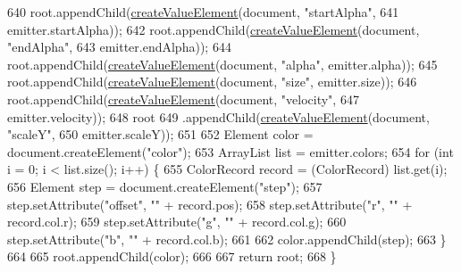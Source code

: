 \begin{DoxyCode}
640         root.appendChild(\mbox{\hyperlink{classorg_1_1newdawn_1_1slick_1_1particles_1_1_particle_i_o_ad9f392331cc84467398b6ac9c41a1d7b}{createValueElement}}(document, \textcolor{stringliteral}{"startAlpha"},
641                 emitter.startAlpha));
642         root.appendChild(\mbox{\hyperlink{classorg_1_1newdawn_1_1slick_1_1particles_1_1_particle_i_o_ad9f392331cc84467398b6ac9c41a1d7b}{createValueElement}}(document, \textcolor{stringliteral}{"endAlpha"},
643                 emitter.endAlpha));
644         root.appendChild(\mbox{\hyperlink{classorg_1_1newdawn_1_1slick_1_1particles_1_1_particle_i_o_ad9f392331cc84467398b6ac9c41a1d7b}{createValueElement}}(document, \textcolor{stringliteral}{"alpha"}, emitter.alpha));
645         root.appendChild(\mbox{\hyperlink{classorg_1_1newdawn_1_1slick_1_1particles_1_1_particle_i_o_ad9f392331cc84467398b6ac9c41a1d7b}{createValueElement}}(document, \textcolor{stringliteral}{"size"}, emitter.size));
646         root.appendChild(\mbox{\hyperlink{classorg_1_1newdawn_1_1slick_1_1particles_1_1_particle_i_o_ad9f392331cc84467398b6ac9c41a1d7b}{createValueElement}}(document, \textcolor{stringliteral}{"velocity"},
647                 emitter.velocity));
648         root
649                 .appendChild(\mbox{\hyperlink{classorg_1_1newdawn_1_1slick_1_1particles_1_1_particle_i_o_ad9f392331cc84467398b6ac9c41a1d7b}{createValueElement}}(document, \textcolor{stringliteral}{"scaleY"},
650                         emitter.scaleY));
651 
652         Element color = document.createElement(\textcolor{stringliteral}{"color"});
653         ArrayList list = emitter.colors;
654         \textcolor{keywordflow}{for} (\textcolor{keywordtype}{int} i = 0; i < list.size(); i++) \{
655             ColorRecord record = (ColorRecord) list.get(i);
656             Element step = document.createElement(\textcolor{stringliteral}{"step"});
657             step.setAttribute(\textcolor{stringliteral}{"offset"}, \textcolor{stringliteral}{""} + record.pos);
658             step.setAttribute(\textcolor{stringliteral}{"r"}, \textcolor{stringliteral}{""} + record.col.r);
659             step.setAttribute(\textcolor{stringliteral}{"g"}, \textcolor{stringliteral}{""} + record.col.g);
660             step.setAttribute(\textcolor{stringliteral}{"b"}, \textcolor{stringliteral}{""} + record.col.b);
661 
662             color.appendChild(step);
663         \}
664 
665         root.appendChild(color);
666 
667         \textcolor{keywordflow}{return} root;
668     \}
\end{DoxyCode}
\mbox{\label{classorg_1_1newdawn_1_1slick_1_1particles_1_1_particle_i_o_a84405f6266ad1512ddbd9939dd73e02f}} 
